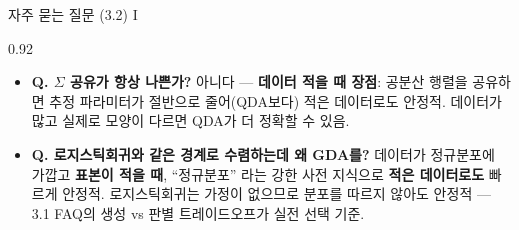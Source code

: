 \begin{frame}{자주 묻는 질문 (3.2) I}
\begin{center}\begin{varwidth}{0.92\textwidth}
  \begin{itemize}
    \item \textbf{Q. $\Sigma$ 공유가 항상 나쁜가?} 아니다 ---
      \textbf{데이터 적을 때 장점}: 공분산 행렬을 공유하면 추정
      파라미터가 절반으로 줄어(QDA보다) 적은 데이터로도 안정적.
      데이터가 많고 실제로 모양이 다르면 QDA가 더 정확할 수 있음.
    \item \textbf{Q. 로지스틱회귀와 같은 경계로 수렴하는데 왜 GDA를?}
      데이터가 정규분포에 가깝고 \textbf{표본이 적을 때}, ``정규분포''
      라는 강한 사전 지식으로 \textbf{적은 데이터로도} 빠르게 안정적.
      로지스틱회귀는 가정이 없으므로 분포를 따르지 않아도 안정적 ---
      3.1 FAQ의 생성 vs 판별 트레이드오프가 실전 선택 기준.
  \end{itemize}
\end{varwidth}\end{center}
\end{frame}
